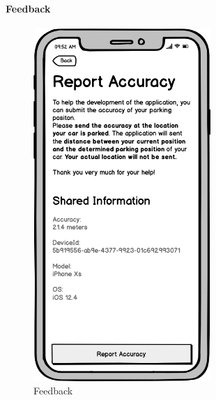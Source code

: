 \paragraph{Feedback}


\begin{figure}[h]
  \centering
  \begin{minipage}[b]{0.49\textwidth}
    \centering
    \includegraphics[width=0.6\textwidth]{images/UI/Iteration4-Feedback.png}
    \caption{Feedback}
    \label{fig:feedback}
  \end{minipage}
  \hfill
  \begin{minipage}[b]{0.49\textwidth}
    \centering

\end{minipage}
\end{figure}
